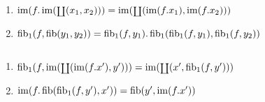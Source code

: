 \begin{lemm}[Regel (f)] $\quad$ %
\begin{enumerate}
\item $\im(f.\im(\coprodop(x_1,x_2))) = \im(\coprodop(\im(f.x_1),\im(f.x_2)))$
\item $\fib_1(f,\fib(y_1,y_2)) = \fib_1(f,y_1) . \fib_1(\fib_1(f,y_1),\fib_1(f,y_2))$
\end{enumerate}
\end{lemm}

\begin{lemm} $\quad$ %
\begin{enumerate}
\item $\fib_1(f,\im(\coprodop(\im(f.x'),y'))) = \im(\coprodop(x',\fib_1(f,y')))$
\item $\im(f.\fib(\fib_1(f,y'),x')) = \fib(y',\im(f.x'))$
\end{enumerate}
\end{lemm}
